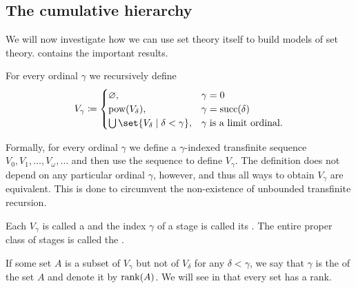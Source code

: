 \subsection{The cumulative hierarchy}\label{subsec:cumulative_hierarchy}

We will now investigate how we can use set theory itself to build models of set theory.  contains the important results.

\begin{definition}\label{def:cumulative_hierarchy}
  For every ordinal \( \gamma \) we recursively define
  \begin{equation*}
    V_\gamma \coloneqq \begin{cases}
      \varnothing,                                    &\gamma = 0 \\
      \pow(V_\delta),                                 &\gamma = \op{succ}(\delta) \\
      \bigcup\set{ V_\delta \given \delta < \gamma }, &\gamma \T{is a limit ordinal.}
    \end{cases}
  \end{equation*}

  Formally, for every ordinal \( \gamma \) we define a \( \gamma \)-indexed transfinite sequence \( V_0, V_1, \ldots, V_\omega, \ldots \) and then use the sequence to define \( V_\gamma \). The definition does not depend on any particular ordinal \( \gamma \), however, and thus all ways to obtain \( V_\gamma \) are equivalent. This is done to circumvent the non-existence of unbounded transfinite recursion.

  Each \( V_\gamma \) is called a  and the index \( \gamma \) of a stage is called its . The entire proper class of stages is called the .

  If some set \( A \) is a subset of \( V_\gamma \) but not of \( V_\delta \) for any \( \delta < \gamma \), we say that \( \gamma \) is the  of the set \( A \) and denote it by \( \operatorname{rank}(A) \). We will see in  that every set has a rank.
\end{definition}

